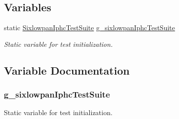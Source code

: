 \subsection*{Variables}
\begin{DoxyCompactItemize}
\item 
static \hyperlink{classSixlowpanIphcTestSuite}{Sixlowpan\+Iphc\+Test\+Suite} \hyperlink{sixlowpan-iphc-test_8cc_a9a5301649ce351304e516c74751a7989}{g\+\_\+sixlowpan\+Iphc\+Test\+Suite}
\begin{DoxyCompactList}\small\item\em Static variable for test initialization. \end{DoxyCompactList}\end{DoxyCompactItemize}


\subsection{Variable Documentation}
\subsubsection[{\texorpdfstring{g\+\_\+sixlowpan\+Iphc\+Test\+Suite}{g_sixlowpanIphcTestSuite}}]{ g\+\_\+sixlowpan\+Iphc\+Test\+Suite\hspace{0.3cm}{\ttfamily [static]}}\hypertarget{sixlowpan-iphc-test_8cc_a9a5301649ce351304e516c74751a7989}{}\label{sixlowpan-iphc-test_8cc_a9a5301649ce351304e516c74751a7989}


Static variable for test initialization. 

